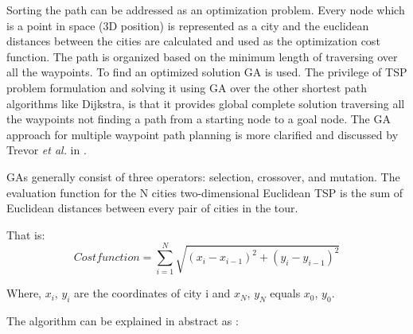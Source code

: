 Sorting the path can be addressed as an optimization problem. Every node which is a point in space (3D position) is represented as a city and the euclidean distances between the cities are calculated and used as the optimization cost function. The path is organized based on the minimum length of traversing over all the waypoints. To find an optimized solution GA is used. The privilege of TSP problem formulation and solving it using GA over the other shortest path algorithms like Dijkstra, is that it provides global complete solution traversing all the waypoints not finding a path from a starting node to a goal node. The GA approach for multiple waypoint path planning is more clarified and discussed by Trevor \textit{et al.} in \cite{davies2006multiple}.


GAs generally consist of three operators: selection, crossover, and mutation. The evaluation function for the N cities two-dimensional Euclidean TSP is the sum of Euclidean distances between every pair of cities in the tour. 

That is: 
\[Cost function = \sum_{i=1}^{N}  \sqrt{(x_{i}-x_{i-1})^{2}+(y_{i}-y_{i-1})^{2}} \]
                                           
Where, $x_{i}$, $y_{i}$  are the coordinates of city i and  $x_{N}$, $y_{N}$   equals $x_{0}$, $y_{0}$. %

The algorithm can be explained in abstract as :



